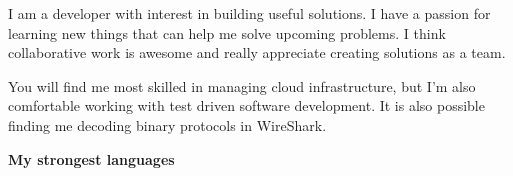 \documentclass[9pt]{template} %
\begin{document}
\vspace{0.5cm}



\begin{minipage}[t]{0.4\textwidth} %
  \vspace{-\baselineskip} %

  I am a developer with interest in building useful solutions. I have a passion
  for learning new things that can help me solve upcoming problems.
  I think collaborative work is awesome and really appreciate creating
  solutions as a team.

  You will find me most skilled in managing cloud infrastructure, but I'm also
  comfortable working with test driven software development. It is also possible
  finding me decoding binary protocols in WireShark.
\end{minipage}
\hfill %
\begin{minipage}[t]{0.5\textwidth} %
  \vspace{-\baselineskip} %
  \textbf{My strongest languages}
  \begin{barchart}{5.5}
  \end{barchart}
\end{minipage}

\begin{center}
\end{center}


\end{document}
